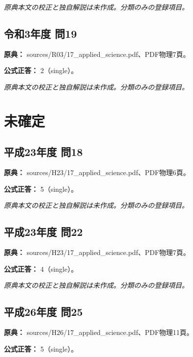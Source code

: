 \par\textit{原典本文の校正と独自解説は未作成。分類のみの登録項目。}

\subsection{令和3年度 問19}
\label{q:r03-reg-applied-19}

\noindent\textbf{原典：} sources/R03/17\_applied\_science.pdf、PDF物理7頁。

\textbf{公式正答：} 2（single）。

\par\textit{原典本文の校正と独自解説は未作成。分類のみの登録項目。}

\section{未確定}

\subsection{平成23年度 問18}
\label{q:h23-reg-applied-18}

\noindent\textbf{原典：} sources/H23/17\_applied\_science.pdf、PDF物理6頁。

\textbf{公式正答：} 5（single）。

\par\textit{原典本文の校正と独自解説は未作成。分類のみの登録項目。}

\subsection{平成23年度 問22}
\label{q:h23-reg-applied-22}

\noindent\textbf{原典：} sources/H23/17\_applied\_science.pdf、PDF物理7頁。

\textbf{公式正答：} 4（single）。

\par\textit{原典本文の校正と独自解説は未作成。分類のみの登録項目。}

\subsection{平成26年度 問25}
\label{q:h26-reg-applied-25}

\noindent\textbf{原典：} sources/H26/17\_applied\_science.pdf、PDF物理11頁。

\textbf{公式正答：} 5（single）。

